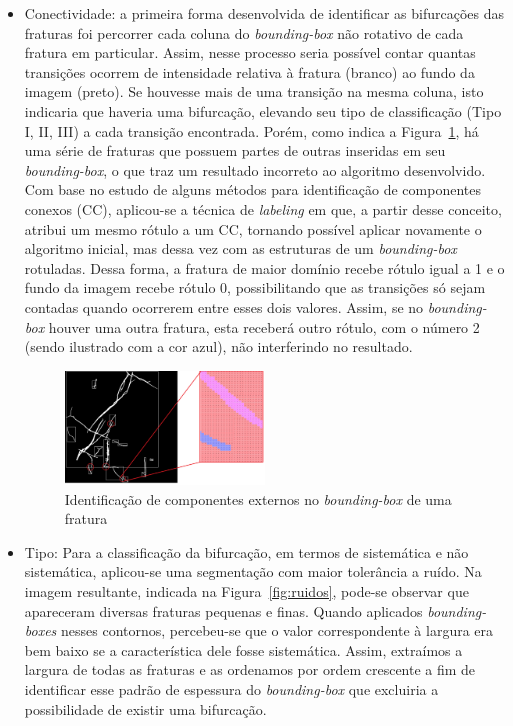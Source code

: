 \documentclass[a4paper,10pt,twocolumn,twoside]{article}
\begin{document}
\begin{itemize}

\item Conectividade: a primeira forma desenvolvida de identificar as bifurcações das fraturas foi percorrer cada coluna do \textit{bounding-box} não rotativo de cada fratura em particular. Assim, nesse processo seria possível contar quantas transições ocorrem de intensidade relativa à fratura (branco) ao fundo da imagem (preto). Se houvesse mais de uma transição na mesma coluna, isto indicaria que haveria uma bifurcação, elevando seu tipo de classificação (Tipo I, II, III) a cada transição encontrada. Porém, como indica a Figura~\ref{fig:conectividade}, há uma série de fraturas que possuem partes de outras inseridas em seu \textit{bounding-box}, o que traz um resultado incorreto ao algoritmo desenvolvido. Com base no estudo de alguns métodos para identificação de componentes conexos (CC), aplicou-se a técnica de \textit{labeling} em que, a partir desse conceito, atribui um mesmo rótulo a um CC, tornando possível aplicar novamente o algoritmo inicial, mas dessa vez com as estruturas de um \textit{bounding-box} rotuladas. Dessa forma, a fratura de maior domínio recebe rótulo igual a 1 e o fundo da imagem recebe rótulo 0, possibilitando que as transições só sejam contadas quando ocorrerem entre esses dois valores. Assim, se no \textit{bounding-box} houver uma outra fratura, esta receberá outro rótulo, com o número 2 (sendo ilustrado com a cor azul), não interferindo no resultado.

\begin{figure}[!htb]
\centering
\includegraphics[width=0.5\textwidth]{Figuras/conectividade.png}
\caption{Identificação de componentes externos no \textit{bounding-box} de uma fratura}
\label{fig:conectividade}
\end{figure}

\item Tipo: Para a classificação da bifurcação, em termos de sistemática e não sistemática, aplicou-se uma segmentação com maior tolerância a ruído. Na imagem resultante, indicada na Figura~\ref{fig:ruidos}, pode-se observar que apareceram diversas fraturas pequenas e finas. Quando aplicados \textit{bounding-boxes} nesses contornos, percebeu-se que o valor correspondente à largura era bem baixo se a característica dele fosse sistemática. Assim, extraímos a largura de todas as fraturas e as ordenamos por ordem crescente a fim de identificar esse padrão de espessura do \textit{bounding-box} que excluiria a possibilidade de existir uma bifurcação.


\end{itemize}
\end{document}
